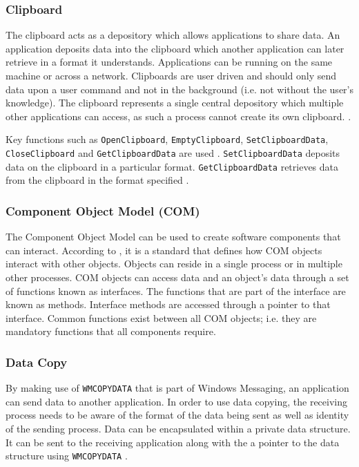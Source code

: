 \documentclass[12pt,a4paper,oneside]{article}
\def\code#1{\texttt{#1}}
\begin{document}
    \subsubsection{Clipboard}
      The clipboard acts as a depository which allows applications to share data. An application deposits data into the clipboard which another application can later retrieve in a format it understands. Applications can be running on the same machine or across a network. Clipboards are user driven and should only send data upon a user command and not in the background (i.e. not without the user's knowledge). The clipboard represents a single central depository which multiple other applications can access, as such a process cannot create its own clipboard. \citep{MSDN_IPCExplanation}.

      Key functions such as \code{OpenClipboard}, \code{EmptyClipboard}, \code{SetClipboardData}, \code{CloseClipboard} and \code{GetClipboardData} are used \citep{IPCWindowsLinkedInSlides}. \code{SetClipboardData} deposits data on the clipboard in a particular format. \code{GetClipboardData} retrieves data from the clipboard in the format specified \citep{MSDN_API}.

    \subsubsection{Component Object Model (COM)}
      The Component Object Model can be used to create software components that can interact. According to \cite{MSDN_API}, it is a standard that defines how COM objects interact with other objects. Objects can reside in a single process or in multiple other processes. COM objects can access data and an object's data through a set of functions known as interfaces. The functions that are part of the interface are known as methods. Interface methods are accessed through a pointer to that interface. Common functions exist between all COM objects; i.e. they are mandatory functions that all components require.

    \subsubsection{Data Copy}
      By making use of \code{WMCOPYDATA} that is part of Windows Messaging, an application can send data to another application. In order to use data copying, the receiving process needs to be aware of the format of the data being sent as well as identity of the sending process. Data can be encapsulated within a private data structure. It can be sent to the receiving application along with the a pointer to the data structure using \code{WMCOPYDATA} \citep{MSDN_API}.
\end{document}

